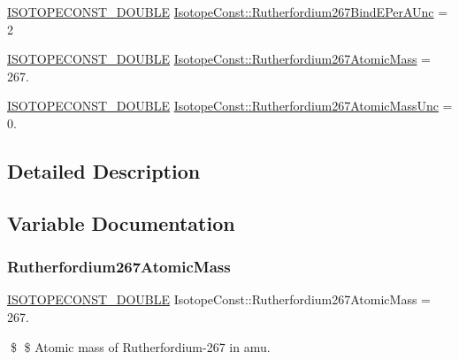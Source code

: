 \begin{DoxyCompactItemize}
\item 
\mbox{\hyperlink{group___isotope_const-_macros_ga8f45a7272ce02c0b4c65c44636ed719a}{I\+S\+O\+T\+O\+P\+E\+C\+O\+N\+S\+T\+\_\+\+D\+O\+U\+B\+LE}} \mbox{\hyperlink{group___isotope_const-_rutherfordium-_rf267_ga583a51b9003245b13e8ce1a9c75cfb68}{Isotope\+Const\+::\+Rutherfordium267\+Bind\+E\+Per\+A\+Unc}} = 2
\item 
\mbox{\hyperlink{group___isotope_const-_macros_ga8f45a7272ce02c0b4c65c44636ed719a}{I\+S\+O\+T\+O\+P\+E\+C\+O\+N\+S\+T\+\_\+\+D\+O\+U\+B\+LE}} \mbox{\hyperlink{group___isotope_const-_rutherfordium-_rf267_gaea2eb8389a21c2678548415131bcacd0}{Isotope\+Const\+::\+Rutherfordium267\+Atomic\+Mass}} = 267.
\item 
\mbox{\hyperlink{group___isotope_const-_macros_ga8f45a7272ce02c0b4c65c44636ed719a}{I\+S\+O\+T\+O\+P\+E\+C\+O\+N\+S\+T\+\_\+\+D\+O\+U\+B\+LE}} \mbox{\hyperlink{group___isotope_const-_rutherfordium-_rf267_ga949b9a6b3ee2d6ebb2686a826eb26271}{Isotope\+Const\+::\+Rutherfordium267\+Atomic\+Mass\+Unc}} = 0.
\end{DoxyCompactItemize}


\subsection{Detailed Description}


\subsection{Variable Documentation}
\mbox{\label{group___isotope_const-_rutherfordium-_rf267_gaea2eb8389a21c2678548415131bcacd0}} 
\subsubsection{\texorpdfstring{Rutherfordium267\+Atomic\+Mass}{Rutherfordium267AtomicMass}}
{\footnotesize\ttfamily \mbox{\hyperlink{group___isotope_const-_macros_ga8f45a7272ce02c0b4c65c44636ed719a}{I\+S\+O\+T\+O\+P\+E\+C\+O\+N\+S\+T\+\_\+\+D\+O\+U\+B\+LE}} Isotope\+Const\+::\+Rutherfordium267\+Atomic\+Mass = 267.}

\$ \$ Atomic mass of Rutherfordium-\/267 in amu. \mbox{\label{group___isotope_const-_rutherfordium-_rf267_ga949b9a6b3ee2d6ebb2686a826eb26271}} 

